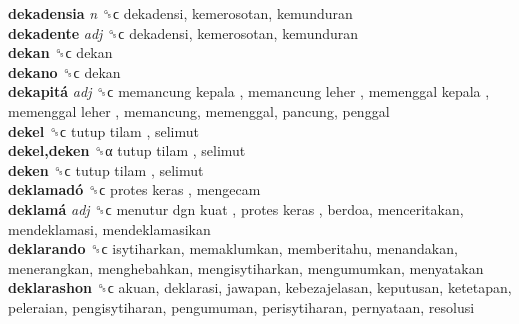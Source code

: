 \textbf{dekadensia} \emph{n}  ␝ϲ  dekadensi, kemerosotan, kemunduran  \\
\textbf{dekadente} \emph{adj}  ␝ϲ  dekadensi, kemerosotan, kemunduran  \\
\textbf{dekan} ␝ϲ  dekan  \\
\textbf{dekano} ␝ϲ  dekan  \\
\textbf{dekapitá} \emph{adj}  ␝ϲ   memancung kepala ,  memancung leher ,  memenggal kepala ,  memenggal leher , memancung, memenggal, pancung, penggal  \\
\textbf{dekel} ␝ϲ   tutup tilam , selimut  \\
\textbf{dekel,deken} ␝α   tutup tilam , selimut  \\
\textbf{deken} ␝ϲ   tutup tilam , selimut  \\
\textbf{deklamadó} ␝ϲ   protes keras , mengecam  \\
\textbf{deklamá} \emph{adj}  ␝ϲ   menutur dgn kuat ,  protes keras , berdoa, menceritakan, mendeklamasi, mendeklamasikan  \\
\textbf{deklarando} ␝ϲ  isytiharkan, memaklumkan, memberitahu, menandakan, menerangkan, menghebahkan, mengisytiharkan, mengumumkan, menyatakan  \\
\textbf{deklarashon} ␝ϲ  akuan, deklarasi, jawapan, kebezajelasan, keputusan, ketetapan, peleraian, pengisytiharan, pengumuman, perisytiharan, pernyataan, resolusi  \\
